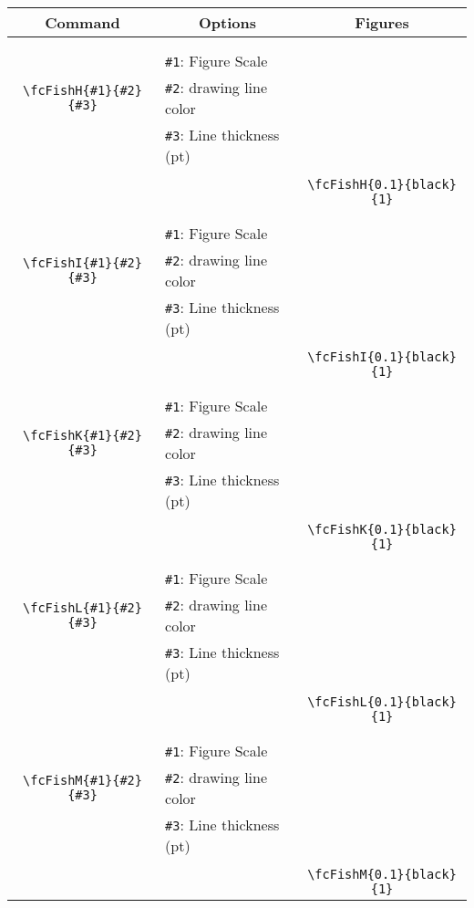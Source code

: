 \documentclass[x11names]{article}
\begin{document}
\begin{table}[H]\centering\begin{tabular}{|c|l|c|}\hline {\bf Command}& \multicolumn{1}{c|}{{\bf Options}} & {\bf Figures}\\  \hline	&&\multirow{5}{*}{\fcFishH{0.1}{black}{1}}\\	&&\\	&\verb|#1|: Figure Scale &\\	\verb|\fcFishH{#1}{#2}{#3}|&	\verb|#2|: drawing line color &\\	&\verb|#3|: Line thickness (pt) &\\ &&\\&&	\verb|\fcFishH{0.1}{black}{1}|\\\hline 	
	&&\multirow{5}{*}{\fcFishI{0.1}{black}{1}}\\	&&\\	&\verb|#1|: Figure Scale &\\	\verb|\fcFishI{#1}{#2}{#3}|&	\verb|#2|: drawing line color &\\	&\verb|#3|: Line thickness (pt) &\\ &&\\&&	\verb|\fcFishI{0.1}{black}{1}|\\\hline 	
	&&\multirow{5}{*}{\fcFishK{0.1}{black}{1}}\\	&&\\	&\verb|#1|: Figure Scale &\\	\verb|\fcFishK{#1}{#2}{#3}|&	\verb|#2|: drawing line color &\\	&\verb|#3|: Line thickness (pt) &\\ &&\\&&	\verb|\fcFishK{0.1}{black}{1}|\\\hline 	
	&&\multirow{5}{*}{\fcFishL{0.1}{black}{1}}\\	&&\\	&\verb|#1|: Figure Scale &\\	\verb|\fcFishL{#1}{#2}{#3}|&	\verb|#2|: drawing line color &\\	&\verb|#3|: Line thickness (pt) &\\ &&\\&&	\verb|\fcFishL{0.1}{black}{1}|\\\hline 	
	&&\multirow{5}{*}{\fcFishM{0.1}{black}{1}}\\	&&\\	&\verb|#1|: Figure Scale &\\	\verb|\fcFishM{#1}{#2}{#3}|&	\verb|#2|: drawing line color &\\	&\verb|#3|: Line thickness (pt) &\\ &&\\&&	\verb|\fcFishM{0.1}{black}{1}|\\\hline 	

\end{tabular}
\end{table}
\end{document}
